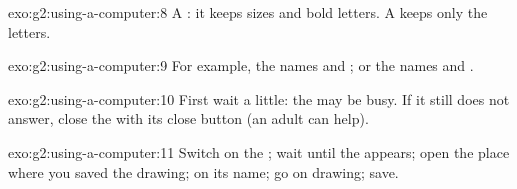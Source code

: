 \begin{solution}{exo:g2:using-a-computer:8}
A : it keeps sizes and bold letters. A  keeps only the
letters.
\end{solution}

\begin{solution}{exo:g2:using-a-computer:9}
For example, the names  and
; or the names  and
.
\end{solution}

\begin{solution}{exo:g2:using-a-computer:10}
First wait a little: the  may be busy. If it still does not answer,
close the  with its close button (an adult can help).
\end{solution}

\begin{solution}{exo:g2:using-a-computer:11}
Switch on the ; wait until the  appears; open the place where
you saved the drawing;  on its name; go on drawing; save.
\end{solution}
